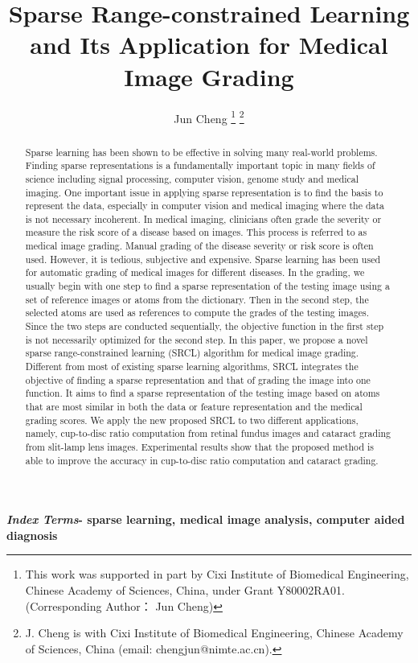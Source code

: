 \documentclass[journal]{IEEEtran}
\title{ Sparse Range-constrained Learning and Its Application for Medical Image Grading}
\author{Jun Cheng 
 \thanks{This work was supported in part by  Cixi Institute of Biomedical Engineering, Chinese Academy of Sciences, China, under Grant Y80002RA01. (Corresponding Author： Jun Cheng) }
\thanks{  J. Cheng is with Cixi Institute of Biomedical Engineering, Chinese Academy of Sciences, China (email: chengjun@nimte.ac.cn).}
 }
\begin{document}

\maketitle

%
 \begin{abstract}Sparse learning has been shown to be effective in
 	solving many real-world problems. Finding sparse representations
 	is a fundamentally important topic in many fields of
 	science including signal processing, computer vision, genome
 	study and medical imaging. One important issue in applying
 	sparse representation is to find the basis to represent the data,
 	especially in computer vision and medical imaging where the
 	data is not necessary incoherent. In medical imaging, clinicians
 	often grade the severity or measure the risk score of a disease
 	based on images. This process is referred to as medical image
 	grading. Manual grading of the disease severity or risk score
 	is often used. However, it is tedious, subjective and expensive.
 	Sparse learning has been used for automatic grading of medical
 	images for different diseases. In the grading, we usually begin
 	with one step to find a sparse representation of the testing image
 	using a set of reference images or atoms from the dictionary. Then
 	in the second step, the selected atoms are used as references to
 	compute the grades of the testing images. Since the two steps
 	are conducted sequentially, the objective function in the first
 	step is not necessarily optimized for the second step. In this
 	paper, we propose a novel sparse range-constrained learning
 	(SRCL) algorithm for medical image grading. Different from
 	most of existing sparse learning algorithms, SRCL integrates
 	the objective of finding a sparse representation and that of
 	grading the image into one function. It aims to find a sparse
 	representation of the testing image based on atoms that are
 	most similar in both the data or feature representation and the
 	medical grading scores. We apply the new proposed SRCL to
 	two different applications, namely, cup-to-disc ratio computation
 	from retinal fundus images and cataract grading from slit-lamp
 	lens images. Experimental results show that the proposed method
 	is able to improve the accuracy in cup-to-disc ratio computation
 	and cataract grading.
 



 \end{abstract}
  \textbf{\emph{Index Terms}-
   sparse learning, medical image analysis, computer aided diagnosis}
\end{document}
